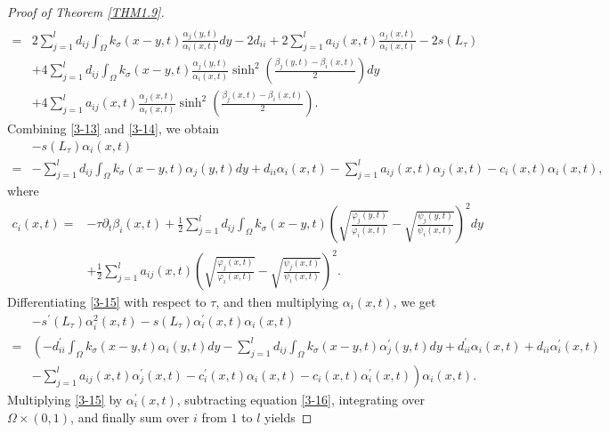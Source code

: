 \documentclass[11pt,reqno]{amsart}
\numberwithin{equation}{section}
\begin{document}
\begin{proof}[Proof of Theorem \ref{THM1.9}]
\begin{align}
\\
=& 2 \sum_{j=1}^{l} d_{ij}\int_{\Omega}k_{\sigma}(x-y,t) \frac{\alpha_{j}(y,t)}{\alpha_{i}(x,t)} dy
-
2d_{ii}
+
2\sum_{j=1}^{l} a_{ij}(x,t) \frac{\alpha_{j}(x,t)}{\alpha_{i}(x,t)} - 2s(L_{\tau})
\\ \nonumber
& + 4\sum_{j=1}^{l} d_{ij} \int_{\Omega} k_{\sigma}(x-y,t)\frac{\alpha_{j}(y,t)}{\alpha_{i}(x,t)}\sinh^{2}\left(\frac{\beta_{j}(y,t)-\beta_{i}(x,t)}{2}\right)dy
\\ \nonumber
&+ 4\sum_{j=1}^{l} a_{ij}(x,t) \frac{\alpha_{j}(x,t)}{\alpha_{i}(x,t)}\sinh^{2}\left(\frac{\beta_{j}(x,t)-\beta_{i}(x,t)}{2}\right).
\end{align}
%
%
Combining \eqref{3-13} and \eqref{3-14}, we obtain
%
%
\begin{equation}\label{3-15}
\begin{aligned}
&-s(L_{\tau})\alpha_{i}(x,t)\\
=&
-\sum_{j=1}^{l} d_{ij}\int_{\Omega}k_{\sigma}(x-y,t)\alpha_{j}(y,t)dy + d_{ii}\alpha_{i}(x,t) - \sum^{l}_{j=1}a_{ij}(x,t)\alpha_{j}(x,t) -c_{i}(x,t)\alpha_{i}(x,t),
\end{aligned}
\end{equation}
%
where
\begin{align*}
c_{i}(x,t)=
&-\tau\partial_{t}\beta_{i}(x,t) + \frac{1}{2}\sum_{j=1}^{l}d_{ij}\int_{\Omega}k_{\sigma}(x-y,t) \left( \sqrt{\frac{\varphi_{j}(y,t)}{\varphi_{i}(x,t)}} - \sqrt{\frac{\psi_{j}(y,t)}{\psi_{i}(x,t)}} \right)^{2}dy
\\
&+\frac{1}{2}\sum_{j=1}^{l}a_{ij}(x,t)\left( \sqrt{\frac{\varphi_{j}(x,t)}{\varphi_{i}(x,t)}}
- \sqrt{\frac{\psi_{j}(x,t)}{\psi_{i}(x,t)}} \right)^{2}.
\end{align*}
%
Differentiating \eqref{3-15} with respect to $\tau$, and then multiplying $\alpha_{i}(x,t)$, we get
\begin{align}\label{3-16}
& - s^{\prime}(L_{\tau})\alpha_{i}^{2}(x,t) - s(L_{\tau})\alpha_{i}^{\prime}(x,t)\alpha_{i}(x,t)
\\ \nonumber
=& \left(- d^{\prime}_{ii}\int_{\Omega}k_{\sigma}(x-y,t)\alpha_{i}(y,t)dy -\sum_{j=1}^{l} d_{ij}\int_{\Omega}k_{\sigma}(x-y,t)\alpha_{j}^{\prime}(y,t)dy + d_{ii}^{\prime}\alpha_{i}(x,t) + d_{ii}\alpha_{i}^{\prime}(x,t)  \right.
\\ 
& \left. -\sum^{l}_{j=1}a_{ij}(x,t)\alpha_{j}^{\prime}(x,t) - c^{\prime}_{i}(x,t)\alpha_{i}(x,t) - c_{i}(x,t)\alpha^{\prime}_{i}(x,t) \right)\alpha_{i}(x,t). \nonumber
\end{align}
Multiplying \eqref{3-15} by $\alpha_{i}^{\prime}(x,t)$, subtracting equation \eqref{3-16}, integrating over $\Omega\times (0,1)$, and finally sum over $i$ from $1$ to $l$  yields

\end{proof}
\end{document}
